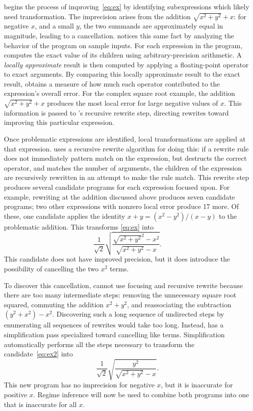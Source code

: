 \documentclass[paper.tex]{subfiles}
\begin{document}
\casio begins the process of improving~\eqref{eq:ex}
  by identifying subexpressions
  which likely need transformation.
The imprecision arises from the addition $\sqrt{x^2 + y^2} + x$:
  for negative $x$, and a small $y$,
  the two summands are approximately equal in magnitude,
  leading to a cancellation.
\casio notices this same fact
  by analyzing the behavior of the program on sample inputs.
For each expression in the program,
  \casio computes the exact value of its children
  using arbitrary-precision arithmetic.
A \emph{locally approximate} result is then computed
  by applying a floating-point operator to exact arguments.
By comparing this locally approximate result to the exact result,
  \casio obtains a measure of how much each operator
  contributed to the expression's overall error.
For the complex square root example,
  the addition $\sqrt{x^2 + y^2} + x$ produces the most local error
  for large negative values of $x$.
This information is passed to \casio's recursive rewrite step,
  directing rewrites toward improving this particular expression.

Once problematic expressions are identified,
  local transformations are applied at that expression.
\casio uses a recursive rewrite algorithm for doing this:
  if a rewrite rule does not immediately pattern match on the expression,
  but destructs the correct operator,
  and matches the number of arguments,
  the children of the expression are recursively rewritten
  in an attempt to make the rule match.
This rewrite step produces several candidate programs
  for each expression focused upon.
For example, rewriting at the addition discussed above
  produces seven candidate programs;
  two other expressions with nonzero local error produce 17 more.
Of these, one candidate applies the identity
  $x + y = (x^2 - y^2) / (x - y)$ to the problematic addition.
This transforms \eqref{eq:ex} into
\begin{equation} \label{eq:ex2}
  \frac1{\sqrt2} \sqrt{\frac{\sqrt{x^2 + y^2}^2 - x^2}{\sqrt{x^2 + y^2} - x}}.
\end{equation}
This candidate does not have improved precision,
  but it does introduce the possibility
  of cancelling the two $x^2$ terms.

To discover this cancellation,
  \casio cannot use focusing and recursive rewrite
  because there are too many intermediate steps:
  removing the unnecessary square root squared,
  commuting the addition $x^2 + y^2$,
  and reassociating the subtraction $(y^2 + x^2) - x^2$.
Discovering such a long sequence of undirected steps
  by enumerating all sequences of rewrites
  would take too long.
Instead, \casio has a simplification pass
  specialized toward cancelling like terms.
Simplification automatically performs all the steps necessary
  to transform the candidate~\eqref{eq:ex2} into
\begin{equation} \label{eq:ex3}
  \frac1{\sqrt2} \sqrt{\frac{y^2}{\sqrt{x^2 + y^2} - x}}.
\end{equation}
This new program has no imprecision for negative $x$,
  but it is inaccurate for positive $x$.
Regime inference will now be used to combine both programs
  into one that is inaccurate for all $x$.
\end{document}
